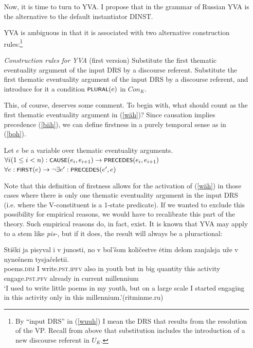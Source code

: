 \documentclass[output=paper,colorlinks,citecolor=brown]{langscibook}
\begin{document}

\noindent Now, it is time to turn to YVA. I propose that in the grammar of Russian YVA is the alternative to the default instantiator DINST. 

YVA is ambiguous in that it is associated with two alternative construction rules:\footnote{By ``input DRS'' in (\ref{wuuh}) I mean the DRS that results from the resolution of the VP. Recall from above that substitution includes the introduction of a new discourse referent in $U_K$.} 

\eanoraggedright\label{wuuh} \textit{Construction rules for YVA} (first version)
\eanoraggedright\label{wäh} Substitute the first thematic eventuality argument of the input DRS by a discourse referent.
\ex\label{woh} Substitute the first thematic eventuality argument of the input DRS by a discourse referent, and introduce for it a condition $\cnst{plural}(e)$ in $Con_K$.   
\z
\z

\noindent This, of course, deserves some comment. To begin with, what should count as the first thematic eventuality argument in (\ref{wäh})? 
Since causation implies precedence (\ref{bäh}), we can define firstness in a purely temporal sense as in (\ref{boh}). 

\ea Let $e$ be a variable over thematic eventuality arguments.
\ea\label{bäh} $\forall i (1\leq i<n): \cnst{cause}(e_i,e_{i+1}) \rightarrow \cnst{precedes}(e_i,e_{i+1}) $
\ex\label{boh} $\forall e: \cnst{first}(e) \rightarrow \neg \exists e': \cnst{precedes}(e',e)$
\z
\z

\noindent Note that this definition of firstness allows for the activation of (\ref{wäh}) in those cases where there is only one thematic eventuality argument in the input DRS (i.e. where the V-constituent is a 1-state predicate). If we wanted to exclude this possibility for empirical reasons, we would have to recalibrate this part of the theory. 
Such empirical reasons do, in fact, exist. It is known that YVA may apply to a stem like \textit{pis-}, but if it does, the result will always be a pluractional: 

\ea\label{poems}
\gll Stiški
ja pisyval i v junosti, no v bol'šom količestve ėtim delom zanjalsja uže v nynešnem tysjačeletii.\\
poems.\textsc{dim} I 
write.\textsc{pst.ipfv} also in 
youth
but in 
big quantity this activity
engage.\textsc{pst.pfv} already in 
current millennium\\
\glt `I used to write little poems in my youth, but on a large scale I started engaging in this activity only 
in this millennium.'\hfill (ritminme.ru) 
\z 
\end{document}
